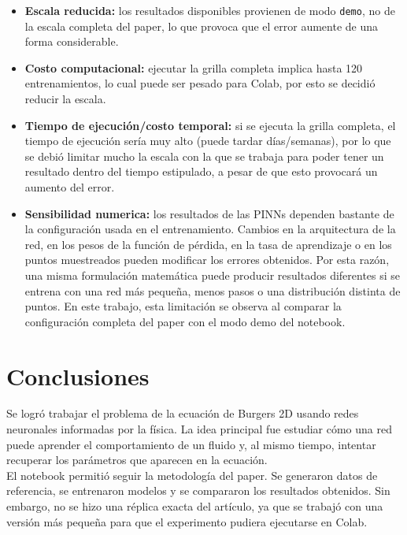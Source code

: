 \documentclass[10pt,letterpaper,twocolumn]{article}
\begin{document}
\begin{itemize}[leftmargin=*]
    \item \textbf{Escala reducida:} los resultados disponibles provienen de modo \texttt{demo}, no de la escala completa del paper, lo que provoca que el error aumente de una forma considerable.
    \item \textbf{Costo computacional:} ejecutar la grilla completa implica hasta 120 entrenamientos, lo cual puede ser pesado para Colab, por esto se decidió reducir la escala.
    \item \textbf{Tiempo de ejecución/costo temporal:} si se ejecuta la grilla completa, el tiempo de ejecución sería muy alto (puede tardar días/semanas), por lo que se debió limitar mucho la escala con la que se trabaja para poder tener un resultado dentro del tiempo estipulado, a pesar de que esto provocará un aumento del error.
    \item \textbf{Sensibilidad numerica:} los resultados de las PINNs dependen bastante de la configuración usada en el entrenamiento. Cambios en la arquitectura de la red, en los pesos de la función de pérdida, en la tasa de aprendizaje o en los puntos muestreados pueden modificar los errores obtenidos. Por esta razón, una misma formulación matemática puede producir resultados diferentes si se entrena con una red más pequeña, menos pasos o una distribución distinta de puntos. En este trabajo, esta limitación se observa al comparar la configuración completa del paper con el modo demo del notebook.

\end{itemize}

\section{Conclusiones}

Se logró trabajar el problema de la ecuación de Burgers 2D usando redes neuronales informadas por la física. La idea principal fue estudiar cómo una red puede aprender el comportamiento de un fluido y, al mismo tiempo, intentar recuperar los parámetros que aparecen en la ecuación.\\

El notebook permitió seguir la metodología del paper. Se generaron datos de referencia, se entrenaron modelos y se compararon los resultados obtenidos. Sin embargo, no se hizo una réplica exacta del artículo, ya que se trabajó con una versión más pequeña para que el experimento pudiera ejecutarse en Colab.\\
\end{document}
